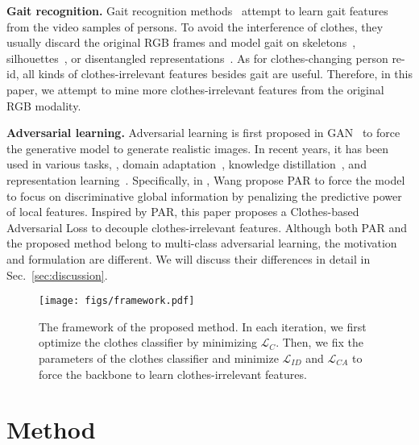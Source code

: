 \documentclass[10pt,twocolumn,letterpaper]{article}
\begin{document}
\medskip
\noindent
{\bf Gait recognition.}
Gait recognition methods~\cite{Zhang2019Gait,Chao2019Gaitset} attempt to learn gait features from the video samples of persons.
To avoid the interference of clothes, they usually discard the original RGB frames and model gait on skeletons~\cite{Yang2016Learning, Ariyanto2012Marionette}, silhouettes~\cite{Chao2019Gaitset, Han2006Individual}, or disentangled representations~\cite{Zhang2019Gait}.
As for clothes-changing person re-id, all kinds of clothes-irrelevant features besides gait are useful.
Therefore, in this paper, we attempt to mine more clothes-irrelevant features from the original RGB modality.

\medskip
\noindent
{\bf Adversarial learning.}
Adversarial learning is first proposed in GAN~\cite{Goodfellow2014GAN} to force the generative model to generate realistic images.
In recent years, it has been used in various tasks, \eg, domain adaptation~\cite{Tzeng2017AdversarialDA,Long2018ConditionalDA}, knowledge distillation~\cite{shen2019MEAL}, and representation learning~\cite{Wang2019LearningRobust}.
Specifically, in \cite{Wang2019LearningRobust}, Wang \etal propose PAR to force the model to focus on discriminative global information by penalizing the predictive power of local features.
Inspired by PAR, this paper proposes a Clothes-based Adversarial Loss to decouple clothes-irrelevant features.
Although both PAR and the proposed method belong to multi-class adversarial learning, the motivation and formulation are different. 
We will discuss their differences in detail in Sec.~\ref{sec:discussion}.


\begin{figure}[t]
	\centering
	\texttt{[image: figs/framework.pdf]}\\
\caption{The framework of the proposed method. In each iteration, we first optimize the clothes classifier by minimizing $\mathcal{L}_C$. Then, we fix the parameters of the clothes classifier and minimize $\mathcal{L}_{ID}$ and $\mathcal{L}_{CA}$ to force the backbone to learn clothes-irrelevant features.}
	\vspace{-10pt}
	\label{fig:framework}
\end{figure}

\section{Method}
\end{document}
